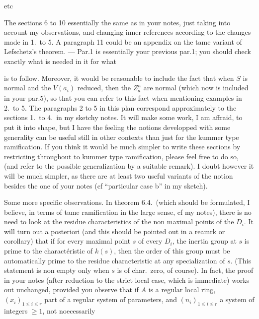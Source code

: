\documentclass[11pt,a4paper]{article}
\begin{document}
etc

The sections 6 to 10 essentially the same as in your notes, just taking into
account my observations, and changing inner references according to the changes
made in 1.\ to 5. A paragraph 11 could be an appendix on the tame variant of
Lefschetz's theorem. --- Par.1 is essentially your previous par.1; you should
check exactly what is needed in it for what

is to follow. Moreover, it would be reasonable to include the fact that when
$S$ is normal and the $V(a_i)$ reduced, then the $Z^{\underline{n}}_{\underline{a}}$
are normal (which now is included in your par.5), so that you can refer to this
fact when mentioning examples in  2.\ to 5. The paragraphs 2
to 5 in this plan correspond approximately to the sections 1.\ to 4.\ in my
sketchy notes. It will make some work, I am affraid, to put it into shape, but
I have the feeling the notions developped with some generality can be useful
still in other contexts than just for the kummer type ramification. If you
think it would be much simpler to write these sections by restricting
throughout to kummer type ramification, please feel free to do so, (and refer
to the possible generalization by a suitable remark). I doubt however it will
be much simpler, as there are at least two useful variants of the notion
besides the one of your notes (cf ``particular case b'' in my sketch).

Some more specific observations. In theorem 6.4.\ (which should be formulated,
I believe, in terms of tame ramification in the large sense, cf my notes),
there is no need to look at the residue characteristics of the non maximal
points of the $D_i$. It will turn out a posteriori (and this should be pointed
out in a reamrk or corollary) that if for every maximal point $s$ of every
$D_i$, the inertia group at $s$ is prime to the charactéristic of $k(s)$, then
the order of this group must be automatically prime to the residue
characteristic at any specialization of $s$. (This statement is non empty only
when $s$ is of char.\ zero, of course). In fact, the proof in your notes (after
reduction to the strict local case, which is immediate) works out unchanged,
provided you observe that if $A$ is a regular local ring, $(x_i)_{1 \leqslant i
\leqslant r}$ part of a regular system of parameters, and $(n_i)_{1 \leqslant i
\leqslant r}$ a system of integers $\geqslant 1$, not noecessarily
\end{document}
